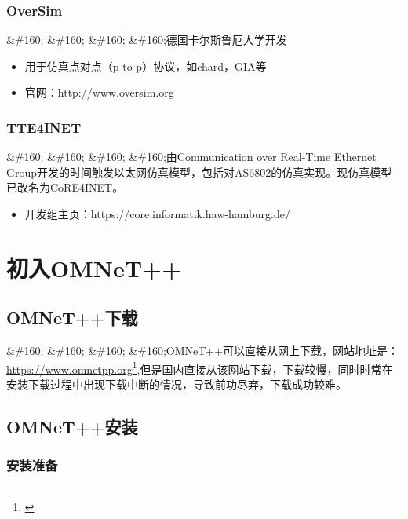 \subsection{OverSim}
\label{oversim}

\&\#160; \&\#160; \&\#160; \&\#160;德国卡尔斯鲁厄大学开发

\begin{itemize}
\item 用于仿真点对点（p-to-p）协议，如chard，GIA等

\item 官网：http:\slash \slash www.oversim.org

\end{itemize}

\subsection{TTE4INET}
\label{tte4inet}

\&\#160; \&\#160; \&\#160; \&\#160;由Communication over Real-Time Ethernet Group开发的时间触发以太网仿真模型，包括对AS6802的仿真实现。现仿真模型已改名为CoRE4INET。

\begin{itemize}
\item 开发组主页：https:\slash \slash core.informatik.haw-hamburg.de\slash 

\end{itemize}

\chapter{初入OMNeT++}
\label{初入omnet}

\section{OMNeT++下载}
\label{omnet下载}

\&\#160; \&\#160; \&\#160; \&\#160;OMNeT++可以直接从网上下载，网站地址是：\href{}{https:\slash \slash www.omnetpp.org}\footnote{\href{}{}},但是国内直接从该网站下载，下载较慢，同时时常在安装下载过程中出现下载中断的情况，导致前功尽弃，下载成功较难。

\section{OMNeT++安装}
\label{omnet安装}

\subsection{安装准备}
\label{安装准备}

